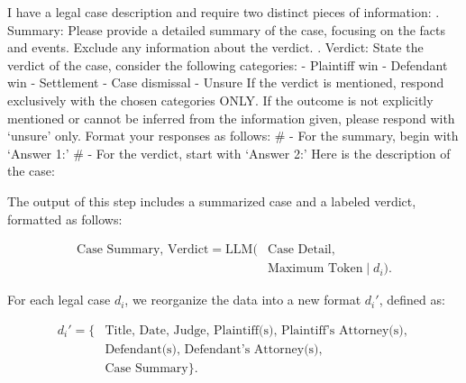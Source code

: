 \begin{formal}
I have a legal case description and require two distinct pieces of information:
. Summary: Please provide a detailed summary of the case, focusing on
the facts and events. Exclude any information about the verdict.
. Verdict: State the verdict of the case, consider the following categories:
\newline
- Plaintiff win\newline
- Defendant win\newline
- Settlement\newline
- Case dismissal\newline
- Unsure\newline
If the verdict is mentioned, respond exclusively with the chosen
categories ONLY. If the outcome is not explicitly mentioned or cannot
be inferred from the information given, please respond with `unsure'
only.
\newline
Format your responses as follows:\newline
\# - For the summary, begin with `Answer 1:'\newline
\# - For the verdict, start with `Answer 2:'\newline
Here is the description of the case:
\end{formal}

The output of this step includes a summarized case and a labeled verdict, formatted as follows:

\begin{equation}
\begin{aligned}
\text{Case Summary, Verdict} = \text{LLM}(&\text{Case Detail}, \\
& \text{Maximum Token} \mid d_i).
\end{aligned}
\end{equation}

For each legal case \(d_i\), we reorganize the data into a new format \(d_i'\), defined as:

\begin{equation}
\begin{aligned}
d_i' = \{& \text{Title, } \text{Date, } \text{Judge, } \text{Plaintiff(s), } \text{Plaintiff's Attorney(s), }\\ 
& \text{Defendant(s), }\text{Defendant's Attorney(s), } \\
& \text{Case Summary}\}.
\end{aligned}
\end{equation}

